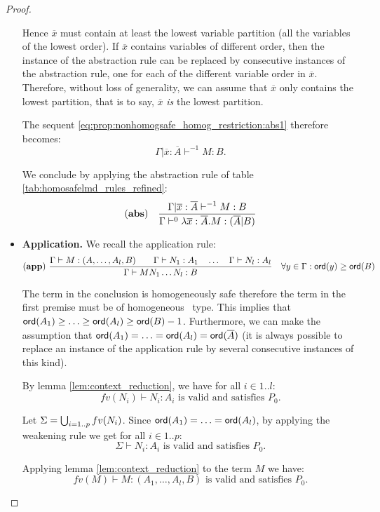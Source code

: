 \begin{proof}
\begin{itemize}
Hence $\overline{x}$ must contain at least the lowest variable
partition (all the variables of the lowest order). If $\overline{x}$
contains variables of different order, then the instance of the
abstraction rule can be replaced by consecutive instances of the
abstraction rule, one for each of the different variable order in
$\overline{x}$. Therefore, without loss of generality, we can assume
that $\overline{x}$ only contains the lowest partition, that is to
say, $\overline{x}$ \emph{is} the lowest partition.

The sequent \ref{eq:prop:nonhomogsafe_homog_restriction:abs1} therefore becomes:
$$\Gamma | \overline{x} : \overline{A} \vdash^{-1} M : B.$$

We conclude by applying the abstraction rule of table
\ref{tab:homosafelmd_rules_refined}:
$$ \mathbf{(abs)} \quad  \frac{\displaystyle \Gamma| \overline{x} : \overline{A} \vdash^{-1} M : B}{\Gamma  \vdash^{0} \lambda \overline{x} : \overline{A} . M : (\overline{A}|B)}$$



\item \textbf{Application.} We recall the application rule:
$$ \mathbf{(app)} \  \frac{\displaystyle \Gamma \vdash M : (A,\ldots,A_l,B)
                                        \qquad \Gamma \vdash N_1 : A_1
                                        \quad \ldots \quad \Gamma \vdash N_l : A_l  }{\Gamma  \vdash M N_1 \ldots N_l : B}
                                    \quad
                                   \forall y \in \Gamma : {\sf ord}(y) \geq {\sf ord}(B)$$

The term in the conclusion is homogeneously safe therefore the term in the first premise must be of homogeneous \
type. This implies that ${\sf ord}(A_1) \geq \ldots \geq {\sf ord}(A_l)
\geq {\sf ord}(B) - 1$.
Furthermore, we can make the assumption that ${\sf ord}(A_1) = \ldots = {\sf ord}(A_l) = {\sf ord}(\overline{A})$
(it is always possible to replace an instance of the application rule
by several consecutive instances of this kind).

By lemma \ref{lem:context_reduction}, we have for all $i \in 1..l$:
$$fv(N_i) \vdash N_i : A_i \mbox{ is valid and satisfies } P_0.$$

Let $\Sigma = \bigcup_{i=1..p} fv(N_i)$. Since ${\sf ord}(A_1) = \ldots = {\sf ord}(A_l)$, by applying the weakening rule we get for all $i\in 1..p$:
$$\Sigma \vdash N_i : A_i \mbox{ is valid and satisfies } P_0.$$


Applying lemma \ref{lem:context_reduction} to the term $M$ we have:
$$fv(M) \vdash M : (A_1,\ldots,A_l,B) \mbox{ is valid and satisfies } P_0.$$


\end{itemize}
\end{proof}
